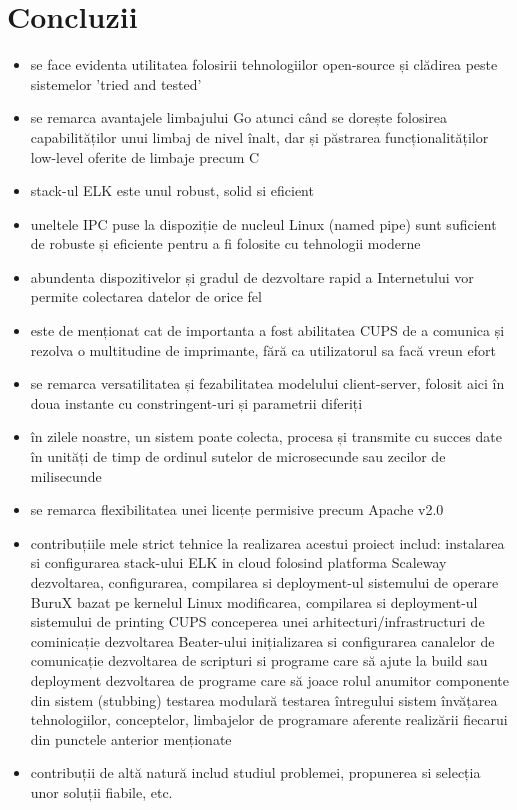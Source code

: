 \documentclass[12pt]{report}
\begin{document}
{\chapter{Concluzii}
\begin{itemize}
	\item se face evidenta utilitatea folosirii tehnologiilor open-source și clădirea peste sistemelor 'tried and tested'
	\item se remarca avantajele limbajului Go atunci când se dorește folosirea capabilităților unui limbaj de nivel înalt, dar și păstrarea funcționalităților low-level oferite de limbaje precum C
	\item stack-ul ELK este unul robust, solid si eficient
	\item uneltele IPC puse la dispoziție de nucleul Linux (named pipe) sunt suficient de robuste și eficiente pentru a fi folosite cu tehnologii moderne
	\item abundenta dispozitivelor și gradul de dezvoltare rapid a Internetului vor permite colectarea datelor de orice fel
	\item este de menționat cat de importanta a fost abilitatea CUPS de a comunica și rezolva o multitudine de imprimante, fără ca utilizatorul sa facă vreun efort
	\item se remarca versatilitatea și fezabilitatea modelului client-server, folosit aici în doua instante cu constringent-uri și parametrii diferiți
	\item în zilele noastre, un sistem poate colecta, procesa și transmite cu succes date în unități de timp de ordinul sutelor de microsecunde sau zecilor de milisecunde
	\item se remarca flexibilitatea unei licențe permisive precum Apache v2.0
	\item contribuțiile mele strict tehnice la realizarea acestui proiect includ:
		\subitem instalarea si configurarea stack-ului ELK in cloud folosind platforma Scaleway
		\subitem dezvoltarea, configurarea, compilarea si deployment-ul sistemului de operare BuruX bazat pe kernelul Linux
		\subitem modificarea, compilarea si deployment-ul sistemului de printing CUPS
		\subitem conceperea unei arhitecturi/infrastructuri de cominicație
		\subitem dezvoltarea Beater-ului
		\subitem inițializarea si configurarea canalelor de comunicație
		\subitem dezvoltarea de scripturi si programe care să ajute la build sau deployment
		\subitem dezvoltarea de programe care să joace rolul anumitor componente din sistem (stubbing)
		\subitem testarea modulară
		\subitem testarea întregului sistem
		\subitem învățarea tehnologiilor, conceptelor, limbajelor de programare aferente realizării fiecarui din punctele anterior menționate
	\item contribuții de altă natură includ studiul problemei, propunerea si selecția unor soluții fiabile, etc.
\end{itemize}

}
\end{document}
